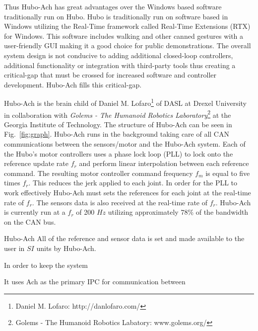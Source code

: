 Thus Hubo-Ach has great advantages over the Windows based software traditionally run on Hubo.
Hubo is traditionally run on software based in Windows utilizing the Real-Time framework called Real-Time Extensions (RTX) for Windows.
This software includes walking and other canned gestures with a user-friendly GUI making it a good choice for public demonstrations.
The overall system design is not conducive to adding additional closed-loop controllers, additional functionality or integration with third-party tools thus creating a critical-gap that must be crossed for increased software and controller development.
Hubo-Ach fills this critical-gap.


Hubo-Ach is the brain child of Daniel M. Lofaro\footnote{Daniel M. Lofaro: http://danlofaro.com/} of DASL at Drexel University in collaboration with \textit{Golems - The Humanoid Robotics Laboratory}\footnote{Golems - The Humanoid Robotics Labatory: www.golems.org/} at the Georgia Institute of Technology.  
The structure of Hubo-Ach can be seen in Fig.~\ref{fig:graph}.
Hubo-Ach runs in the background taking care of all CAN communications between the sensors/motor and the Hubo-Ach system.
Each of the Hubo's motor controllers uses a phase lock loop (PLL) to lock onto the reference update rate $f_r$ and perform linear interpolation between each reference command.  
The resulting motor controller command frequency $f_m$ is equal to five times $f_r$.
This reduces the jerk applied to each joint.
In order for the PLL to work effectively Hubo-Ach must sets the references for each joint at the real-time rate of $f_r$.
The sensors data is also received at the real-time rate of $f_r$.
Hubo-Ach is currently run at a $f_r$ of 200 $Hz$ utilizing approximately 78\% of the bandwidth on the CAN bus.

Hubo-Ach 
All of the reference and sensor data is set and made available to the user in $SI$ units by Hubo-Ach.

In order to keep the system 

It uses Ach as the primary IPC for communication between 





